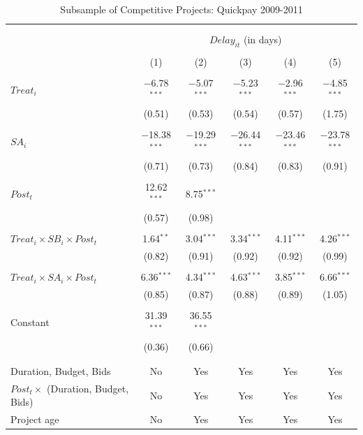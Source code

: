 \documentclass[
]{article}
\begin{document}
\begin{table}[H] \centering 
  \caption{Subsample of Competitive Projects: Quickpay 2009-2011} 
  \label{} 
\small 
\begin{tabular}{@{\extracolsep{-2pt}}lccccc} 
\\[-1.8ex]\hline 
\hline \\[-1.8ex] 
\\[-1.8ex] & \multicolumn{5}{c}{$Delay_{it}$ (in days)} \\ 
\\[-1.8ex] & (1) & (2) & (3) & (4) & (5)\\ 
\hline \\[-1.8ex] 
 $Treat_i$ & $-$6.78$^{***}$ & $-$5.07$^{***}$ & $-$5.23$^{***}$ & $-$2.96$^{***}$ & $-$4.85$^{***}$ \\ 
  & (0.51) & (0.53) & (0.54) & (0.57) & (1.75) \\ 
  & & & & & \\ 
 $SA_i$ & $-$18.38$^{***}$ & $-$19.29$^{***}$ & $-$26.44$^{***}$ & $-$23.46$^{***}$ & $-$23.78$^{***}$ \\ 
  & (0.71) & (0.73) & (0.84) & (0.83) & (0.91) \\ 
  & & & & & \\ 
 $Post_t$ & 12.62$^{***}$ & 8.75$^{***}$ &  &  &  \\ 
  & (0.57) & (0.98) &  &  &  \\ 
  & & & & & \\ 
 $Treat_i \times SB_i \times Post_t$ & 1.64$^{**}$ & 3.04$^{***}$ & 3.34$^{***}$ & 4.11$^{***}$ & 4.26$^{***}$ \\ 
  & (0.82) & (0.91) & (0.92) & (0.92) & (0.99) \\ 
  & & & & & \\ 
 $Treat_i \times SA_i \times Post_t$ & 6.36$^{***}$ & 4.34$^{***}$ & 4.63$^{***}$ & 3.85$^{***}$ & 6.66$^{***}$ \\ 
  & (0.85) & (0.87) & (0.88) & (0.89) & (1.05) \\ 
  & & & & & \\ 
 Constant & 31.39$^{***}$ & 36.55$^{***}$ &  &  &  \\ 
  & (0.36) & (0.66) &  &  &  \\ 
  & & & & & \\ 
\hline \\[-1.8ex] 
Duration, Budget, Bids & No & Yes & Yes & Yes & Yes \\ 
$Post_t \times $  (Duration, Budget, Bids) & No & Yes & Yes & Yes & Yes \\ 
Project age & No & Yes & Yes & Yes & Yes \\ 

\end{tabular}
\end{table}
\end{document}
